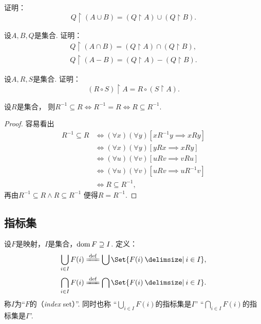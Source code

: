 \begin{example}
证明：\begin{equation}
	Q \upharpoonright (A \cup B)
	= (Q \upharpoonright A)\cup(Q \upharpoonright B).
\end{equation}
\end{example}

\begin{example}
设\(A,B,Q\)是集合.
证明：\begin{gather}
	Q \upharpoonright (A \cap B)
	= (Q \upharpoonright A) \cap (Q \upharpoonright B), \\
	Q \upharpoonright (A - B)
	= (Q \upharpoonright A)
	- (Q \upharpoonright B).
\end{gather}
\end{example}

\begin{example}
设\(A,R,S\)是集合.
证明：\begin{equation}
	(R \circ S) \upharpoonright A = R \circ (S \upharpoonright A).
\end{equation}
\end{example}

\begin{proposition}
设\(R\)是集合，
则\(R^{-1} \subseteq R
\iff R^{-1} = R
\iff R \subseteq R^{-1}\).
\begin{proof}
容易看出\begin{align*}
	R^{-1} \subseteq R
	&\iff
	(\forall x)(\forall y)[xR^{-1}y \implies xRy] \\
	&\iff
	(\forall x)(\forall y)[yRx \implies xRy] \\
	&\iff
	(\forall u)(\forall v)[uRv \implies vRu] \\
	&\iff
	(\forall u)(\forall v)[uRv \implies uR^{-1}v] \\
	&\iff
	R \subseteq R^{-1},
\end{align*}
再由\(R^{-1} \subseteq R \land R \subseteq R^{-1}\)
便得\(R = R^{-1}\).
\end{proof}
\end{proposition}

\subsection{指标集}\label{section:集合论.指标集}
\begin{definition}
设\(F\)是映射，\(I\)是集合，\(\operatorname{dom} F \supseteq I\).
定义：\[
	\bigcup_{i \in I} F(i) \defeq \bigcup\Set{ F(i) \given i \in I },
\]\[
	\bigcap_{i \in I} F(i) \defeq \bigcap\Set{ F(i) \given i \in I }.
\]
称\(I\)为“\(F\)的（\emph{index} set）”.
同时也称
“\(\bigcup_{i \in I} F(i)\)的指标集是\(I\)”
“\(\bigcap_{i \in I} F(i)\)的指标集是\(I\)”.
\end{definition}

